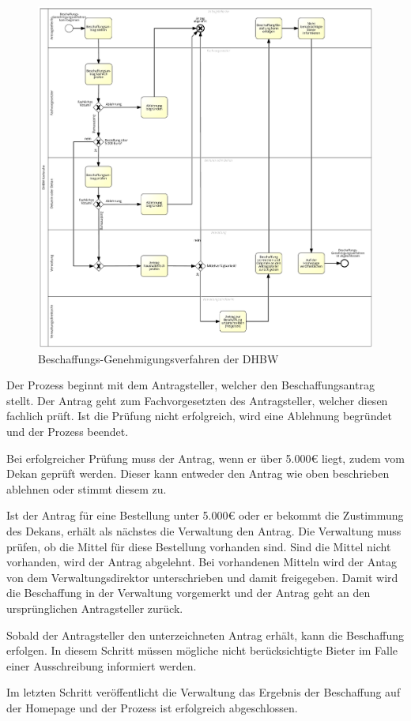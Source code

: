 \begin{figure}
	\includegraphics[width=\textwidth]{images/beschaffungs-genehmigungsverfahren.png}
	\centering
	\caption{Beschaffungs-Genehmigungsverfahren der \gls{DHBW}}
	\label{fig:beschaffungsverfahren}
\end{figure}

Der Prozess beginnt mit dem Antragsteller, welcher den Beschaffungsantrag stellt.
Der Antrag geht zum Fachvorgesetzten des Antragsteller, welcher diesen fachlich prüft.
Ist die Prüfung nicht erfolgreich, wird eine Ablehnung begründet und der Prozess beendet.

Bei erfolgreicher Prüfung muss der Antrag, wenn er über 5.000€ liegt, zudem vom Dekan geprüft werden.
Dieser kann entweder den Antrag wie oben beschrieben ablehnen oder stimmt diesem zu.

Ist der Antrag für eine Bestellung unter 5.000€ oder er bekommt die Zustimmung des Dekans, erhält als nächstes die Verwaltung den Antrag.
Die Verwaltung muss prüfen, ob die Mittel für diese Bestellung vorhanden sind.
Sind die Mittel nicht vorhanden, wird der Antrag abgelehnt.
Bei vorhandenen Mitteln wird der Antag von dem Verwaltungsdirektor unterschrieben und damit freigegeben.
Damit wird die Beschaffung in der Verwaltung vorgemerkt und der Antrag geht an den ursprünglichen Antragsteller zurück.

Sobald der Antragsteller den unterzeichneten Antrag erhält, kann die Beschaffung erfolgen.
In diesem Schritt müssen mögliche nicht berücksichtigte Bieter im Falle einer Ausschreibung informiert werden.

Im letzten Schritt veröffentlicht die Verwaltung das Ergebnis der Beschaffung auf der Homepage und der Prozess ist erfolgreich abgeschlossen.
